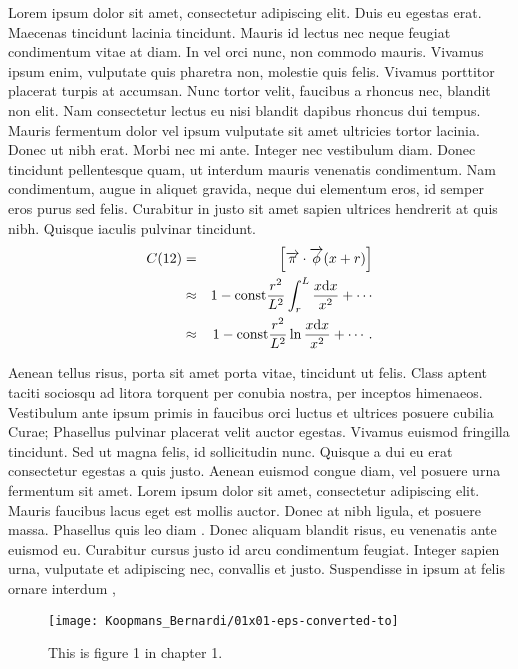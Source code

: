 Lorem ipsum dolor sit amet, consectetur adipiscing elit. Duis eu egestas erat. Maecenas tincidunt lacinia tincidunt. Mauris id lectus nec neque feugiat condimentum vitae at diam. In vel orci nunc, non commodo mauris. Vivamus ipsum enim, vulputate quis pharetra non, molestie quis felis. Vivamus porttitor placerat turpis at accumsan. Nunc tortor velit, faucibus a rhoncus nec, blandit non elit. Nam consectetur lectus eu nisi blandit dapibus rhoncus dui tempus. Mauris fermentum dolor vel ipsum vulputate sit amet ultricies tortor lacinia. Donec ut nibh erat. Morbi nec mi ante. Integer nec vestibulum diam. Donec tincidunt pellentesque quam, ut interdum mauris venenatis condimentum. Nam condimentum, augue in aliquet gravida, neque dui elementum eros, id semper eros purus sed felis. Curabitur in justo sit amet sapien ultrices hendrerit at quis nibh. Quisque iaculis pulvinar tincidunt. 
\begin{eqnarray}
C(12) &= &\left[\overrightarrow{\pi}\cdot\overrightarrow{\phi}(x+r)\right] \nonumber \\ 
&\approx& 1-\mathrm{const}\frac{r^2}{L^2}\int_r^L\frac{x\mathrm{d} x}{x^2} + \cdots \nonumber  \\
&\approx& 1-\mathrm{const}\frac{r^2}{L^2}\ln\frac{x\mathrm{d} x}{x^2} + \cdots .\label{brokenlongeqn}
\end{eqnarray}

Aenean tellus risus, porta sit amet porta vitae, tincidunt ut felis. Class aptent taciti sociosqu ad litora torquent per conubia nostra, per inceptos himenaeos. Vestibulum ante ipsum primis in faucibus orci luctus et ultrices posuere cubilia Curae; Phasellus pulvinar placerat velit auctor egestas. Vivamus euismod fringilla tincidunt. Sed ut magna felis, id sollicitudin nunc. Quisque a dui eu erat consectetur egestas a quis justo. Aenean euismod congue diam, vel posuere urna fermentum sit amet. Lorem ipsum dolor sit amet, consectetur adipiscing elit. Mauris faucibus lacus eget est mollis auctor. Donec at nibh ligula, et posuere massa. Phasellus quis leo diam \cite{diamantaras1996pcn}.
Donec aliquam blandit risus, eu venenatis ante euismod eu. Curabitur cursus justo id arcu condimentum feugiat. Integer sapien urna, vulputate et adipiscing nec, convallis et justo. Suspendisse in ipsum at felis ornare interdum \cite{tulone2006pts},

\begin{figure}[]
\begin{center}
\texttt{[image: Koopmans\_Bernardi/01x01-eps-converted-to]}
\end{center}
\caption{This is figure 1 in chapter 1.}
\end{figure}

